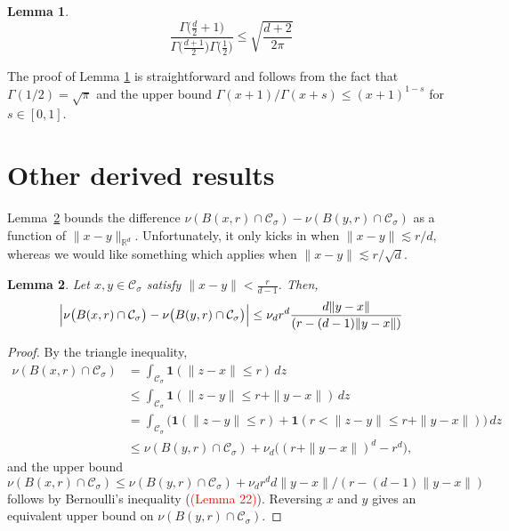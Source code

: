 \documentclass{report}
\newcommand{\Reals}{\mathbb{R}}
\newcommand{\1}{\mathbf{1}}
\newcommand{\Rd}{\Reals^d}
\newcommand{\mc}[1]{\mathcal{#1}}
\theoremstyle{alden}
\theoremstyle{aldenthm}
\newtheorem{lemma}{Lemma}
\theoremstyle{definition}
\theoremstyle{remark}
\begin{document}
\begin{lemma}
	\label{lem: beta_function}
	\begin{equation*}
	\frac{\Gamma\bigl(\frac{d}{2}+ 1\bigr)}{\Gamma\bigl(\frac{d + 1}{2}\bigr) \Gamma\bigl(\frac{1}{2}\bigr)} \leq \sqrt{\frac{d + 2}{2\pi}}
	\end{equation*}
\end{lemma}
\noindent The proof of Lemma \ref{lem: beta_function} is straightforward and follows from the fact that $\Gamma(1/2) = \sqrt{\pi}$ and the upper bound $\Gamma(x + 1)/ \Gamma(x+s) \leq (x + 1)^{1-s}$ for $s \in [0,1]$.

\section{Other derived results}

Lemma~\ref{lem:volume_perturbation} bounds the difference $\nu(B(x,r) \cap \mc{C}_{\sigma}) - \nu(B(y,r) \cap \mc{C}_{\sigma})$ as a function of $\|x - y\|_{\Rd}$. Unfortunately, it only kicks in when $\|x - y\| \lesssim r/d$, whereas we would like something which applies when $\|x - y\| \lesssim r/\sqrt{d}$.

\begin{lemma}
	\label{lem:volume_perturbation}
	Let $x,y \in \mc{C}_{\sigma}$ satisfy $\|x - y\| < \frac{r}{d - 1}$. Then,
	\begin{equation*}
	\Bigl|\nu\bigl(B(x,r) \cap \mc{C}_{\sigma}\bigr) - \nu\bigl(B(y,r) \cap \mc{C}_{\sigma}\bigr)\Bigr| \leq \nu_dr^d\frac{d\|y - x\|}{(r - (d - 1)\|y - x\|)}
	\end{equation*}
\end{lemma}
\begin{proof}
	By the triangle inequality, 
	\begin{align*}
	\nu(B(x,r) \cap \mc{C}_{\sigma}) & = \int_{\mc{C}_{\sigma}} \1(\|z - x\| \leq r) \,dz \\
	& \leq \int_{\mc{C}_{\sigma}} \1(\|z - y\| \leq r + \|y - x\|) \,dz \\
	& = \int_{\mc{C}_{\sigma}} \bigl(\1(\|z - y\| \leq r) + \1(r < \|z - y\| \leq r + \|y - x\|) \bigr)  \,dz \\
	& \leq \nu(B(y,r) \cap \mc{C}_{\sigma}) + \nu_d\bigl((r + \|y - x\|)^d - r^d\bigr),
	\end{align*}
	and the upper bound $\nu(B(x,r) \cap \mc{C}_{\sigma}) \leq \nu(B(y,r) \cap \mc{C}_{\sigma}) +  \nu_dr^dd\|y - x\|/(r - (d - 1)\|y - x\|)$ follows by Bernoulli's inequality (\textcolor{red}{(Lemma 22)}). Reversing $x$ and $y$ gives an equivalent upper bound on $\nu(B(y,r) \cap \mc{C}_{\sigma})$.
\end{proof}
\end{document}
